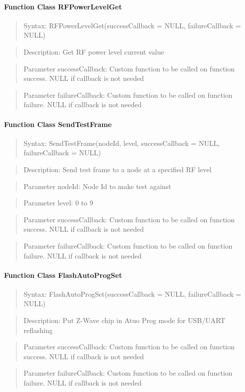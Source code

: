 \paragraph{Function Class RFPowerLevelGet}
\begin{quote}Syntax: RFPowerLevelGet(successCallback = NULL, failureCallback = NULL)\end{quote}
\begin{quote}Description: Get RF power level current value\end{quote}
\begin{quote}Parameter successCallback: Custom function to be called on function success. NULL if callback is not needed\end{quote}
\begin{quote}Parameter failureCallback: Custom function to be called on function failure. NULL if callback is not needed\end{quote}


\paragraph{Function Class SendTestFrame}
\begin{quote}Syntax: SendTestFrame(nodeId, level, successCallback = NULL, failureCallback = NULL)\end{quote}
\begin{quote}Description: Send test frame to a node at a specified RF level\end{quote}
\begin{quote}Parameter nodeId: Node Id to make test against\end{quote}
\begin{quote}Parameter level: 0 to 9\end{quote}
\begin{quote}Parameter successCallback: Custom function to be called on function success. NULL if callback is not needed\end{quote}
\begin{quote}Parameter failureCallback: Custom function to be called on function failure. NULL if callback is not needed\end{quote}


\paragraph{Function Class FlashAutoProgSet}
\begin{quote}Syntax: FlashAutoProgSet(successCallback = NULL, failureCallback = NULL)\end{quote}
\begin{quote}Description: Put Z-Wave chip in Atuo Prog mode for USB/UART reflashing\end{quote}
\begin{quote}Parameter successCallback: Custom function to be called on function success. NULL if callback is not needed\end{quote}
\begin{quote}Parameter failureCallback: Custom function to be called on function failure. NULL if callback is not needed\end{quote}


